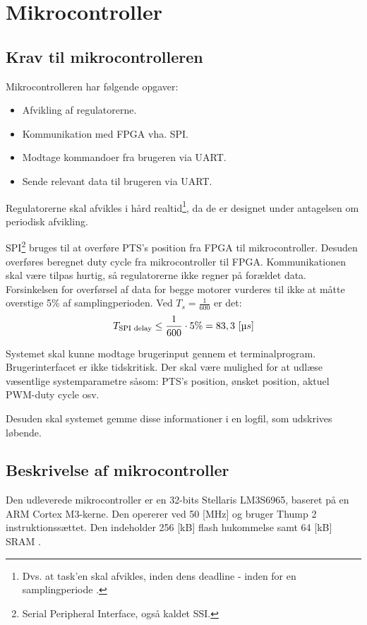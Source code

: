 \section{Mikrocontroller}
\label{sec:mikrocontroller}
%
\subsection{Krav til mikrocontrolleren}
Mikrocontrolleren har følgende opgaver: 

\begin{itemize}
\itemsep1pt
	\item Afvikling af regulatorerne.
	\item Kommunikation med FPGA vha. SPI.
	\item Modtage kommandoer fra brugeren via UART.
	\item Sende relevant data til brugeren via UART.
\end{itemize}

Regulatorerne skal afvikles i hård realtid\footnote{Dvs. at task'en skal afvikles, inden dens deadline - inden for en samplingperiode \citep{operating_systems_concepts_ed8}.},
da de er designet under antagelsen om periodisk afvikling.

SPI\footnote{Serial Peripheral Interface, også kaldet SSI.} bruges til at overføre PTS's position fra FPGA til mikrocontroller.
Desuden overføres beregnet duty cycle fra mikrocontroller til FPGA.
Kommunikationen skal være tilpas hurtig, så regulatorerne ikke regner på forældet data.
Forsinkelsen for overførsel af data for begge motorer vurderes til ikke at måtte overstige 5\% af samplingperioden.
Ved $T_s = \frac{1}{600}$ er det: 
\begin{equation}
	T_{\text{SPI delay}} \leq \frac{1}{600} \cdot 5\% = 83,3~[\micro s]
	\label{eq:uc:spi-krav}
\end{equation}

Systemet skal kunne modtage brugerinput gennem et terminalprogram.
Brugerinterfacet er ikke tidskritisk.
Der skal være mulighed for at udlæse væsentlige systemparametre såsom:
PTS's position, ønsket position, aktuel PWM-duty cycle osv.

Desuden skal systemet gemme disse informationer i en logfil,
som udskrives løbende.

\subsection{Beskrivelse af mikrocontroller}
Den udleverede mikrocontroller er en 32-bits Stellaris LM3S6965, 
baseret på en ARM Cortex M3-kerne. 
Den opererer ved 50 [MHz] og bruger Thump 2 instruktionssættet. 
Den indeholder 256 [kB] flash hukommelse samt 64 [kB] SRAM \citep{lm3s6965}.

